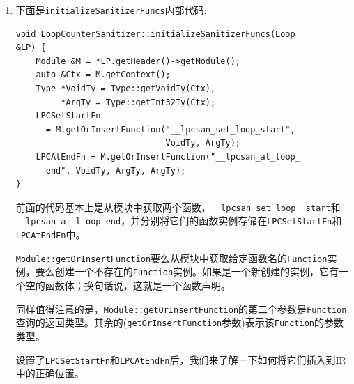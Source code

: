 \begin{enumerate}
\begin{lstlisting}[style=styleCXX]
void foo(int S, int E, int ST) {
	for (int i = S; i < E; i += ST) {
		lpc_set_start(S);
		…
		lpc_at_end(E, ST);
	}
}
\end{lstlisting}

以上代码中的\texttt{lpc\_set\_start}和\texttt{lpc\_at\_end}分别是存储在\texttt{LPCSetStartFn}和\texttt{lpccatendfn}的函数实例中。下面是这两个函数可能的(伪)实现:

\begin{lstlisting}[style=styleCXX]
static int CurrentStartVal = 0;
void lpc_set_start(int start) {
	CurrentStartVal = start;
}
void lpc_at_end(int end, int step) {
	int trip_count = (end – CurrentStartVal) / step;
	printf("Found a loop with trip count %d\n",
	trip_count);
}
\end{lstlisting}

现在我们已经了解了\texttt{LPCSetStartFn}和\texttt{LPCAtEndFn}的角色，接下来看看\texttt{initializeSan itizerFuncs}是如何初始化它们的。

\item 下面是\texttt{initializeSanitizerFuncs}内部代码:

\begin{lstlisting}[style=styleCXX]
void LoopCounterSanitizer::initializeSanitizerFuncs(Loop
&LP) {
	Module &M = *LP.getHeader()->getModule();
	auto &Ctx = M.getContext();
	Type *VoidTy = Type::getVoidTy(Ctx),
	     *ArgTy = Type::getInt32Ty(Ctx);
	LPCSetStartFn
	  = M.getOrInsertFunction("__lpcsan_set_loop_start",
	                          VoidTy, ArgTy);
	LPCAtEndFn = M.getOrInsertFunction("__lpcsan_at_loop_
	  end", VoidTy, ArgTy, ArgTy);
}
\end{lstlisting}

前面的代码基本上是从模块中获取两个函数，\texttt{\_\_lpcsan\_set\_loop\_ start}和\texttt{\_\_lpcsan\_at\_l oop\_end}，并分别将它们的函数实例存储在\texttt{LPCSetStartFn}和\texttt{LPCAtEndFn}中。

\texttt{Module::getOrInsertFunction}要么从模块中获取给定函数名的\texttt{Function}实例，要么创建一个不存在的\texttt{Function}实例。如果是一个新创建的实例，它有一个空的函数体；换句话说，这就是一个函数声明。

同样值得注意的是，\texttt{Module::getOrInsertFunction}的第二个参数是\texttt{Function}查询的返回类型。其余的(\texttt{getOrInsertFunction}参数)表示该\texttt{Function}的参数类型。

设置了\texttt{LPCSetStartFn}和\texttt{LPCAtEndFn}后，我们来了解一下如何将它们插入到IR中的正确位置。


\end{enumerate}
